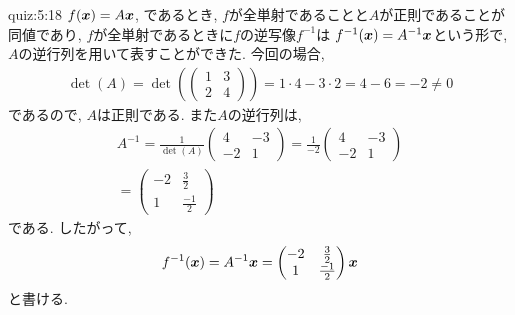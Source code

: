 \begin{answerof}{quiz:5:18}
  $f(\boldsymbol{x})=A\boldsymbol{x}$, 
  であるとき,
  $f$が全単射であることと$A$が正則であることが同値であり,
  $f$が全単射であるときに$f$の逆写像$f^{-1}$は
  $f^{-1}(\boldsymbol{x})=A^{-1}\boldsymbol{x}$という形で,
  $A$の逆行列を用いて表すことができた.
  今回の場合,
  \begin{align*}
    \det(A)=
    \det(\begin{pmatrix}1&3\\2&4\end{pmatrix})
      =1\cdot4-3\cdot 2=4-6=-2\neq 0
  \end{align*}
  であるので, $A$は正則である.
  また$A$の逆行列は,
  \begin{align*}
    A^{-1}=\frac{1}{\det(A)}
    \begin{pmatrix}4&-3\\-2&1\end{pmatrix}
      =\frac{1}{-2}\begin{pmatrix}4&-3\\-2&1\end{pmatrix}\\
      =\begin{pmatrix}-2&\frac{3}{2}\\1&\frac{-1}{2}\end{pmatrix}
  \end{align*}
  である.
  したがって,
  \begin{align*}
    f^{-1}(\boldsymbol{x})=
    A^{-1}\boldsymbol{x}
      =\begin{pmatrix}-2&\frac{3}{2}\\1&\frac{-1}{2}\end{pmatrix}\boldsymbol{x}
  \end{align*}
  と書ける.
\end{answerof}
